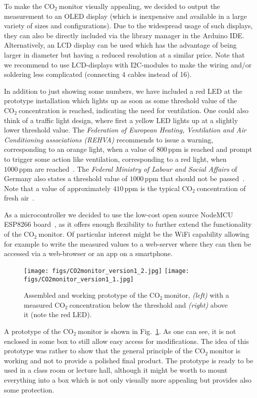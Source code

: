 \documentclass[12pt,a4paper]{article}
\newcommand{\coo}{\ensuremath{\mathrm{CO_2}~}}
\begin{document}
To make the \coo monitor visually appealing, we decided to output the measurement to an OLED display (which is inexpensive and available in a large variety of sizes and configurations). Due to the widespread usage of such displays, they can also be directly included via the library manager in the Arduino IDE. Alternatively, an LCD display can be used which has the advantage of being larger in diameter but having a reduced resolution at a similar price. Note that we recommend to use LCD-displays with I2C-modules to make the wiring and/or soldering less complicated (connecting 4 cables instead of 16).

In addition to just showing some numbers, we have included a red LED at the prototype installation which lights up as soon as some threshold value of the \coo concentration is reached, indicating the need for ventilation. One could also think of a traffic light design, where first a yellow LED lights up at a slightly lower threshold value. The \textit{Federation of European Heating, Ventilation and Air Conditioning associations (REHVA)} recommends to issue a warning, corresponding to an orange light, when a value of $800\,\mathrm{ppm}$ is reached and prompt to trigger some action like ventilation, corresponding to a red light, when $1000\,\mathrm{ppm}$ are reached~\cite{REHVA2020}. The \textit{Federal Ministry of Labour and Social Affairs} of Germany also states a threshold value of $1000\,\mathrm{ppm}$ that should not be passed~\cite{BMA2020}. Note that a value of approximately $410\,\mathrm{ppm}$ is the typical \coo concentration of fresh air~\cite{NOAA2020}.

As a microcontroller we decided to use the low-cost open source NodeMCU ESP8266 board~\cite{NODEMCU2020}, as it offers enough flexibility to further extend the functionality of the \coo monitor. Of particular interest might be the WiFi capability allowing for example to write the measured values to a web-server where they can then be accessed via a web-browser or an app on a smartphone. 

\begin{figure}[t]
\centering
\texttt{[image: figs/CO2monitor\_version1\_2.jpg]}
\hspace{1em}
\texttt{[image: figs/CO2monitor\_version1\_1.jpg]}
\caption{Assembled and working prototype of the \coo monitor, \textit{(left)} with a measured \coo concentration below the threshold and \textit{(right)} above it (note the red LED).}
\label{f:CO2_monitor_photo}
\end{figure}
A prototype of the \coo monitor is shown in Fig.~\ref{f:CO2_monitor_photo}. As one can see, it is not enclosed in some box to still allow easy access for modifications. The idea of this prototype was rather to show that the general principle of the \coo monitor is working and not to provide a polished final product. The prototype is ready to be used in a class room or lecture hall, although it might be worth to mount everything into a box which is not only visually more appealing but provides also some protection.
\end{document}
